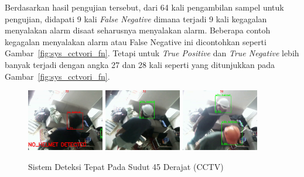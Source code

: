 Berdasarkan hasil pengujian tersebut, dari 64 kali pengambilan sampel untuk pengujian, didapati 9 kali \emph{False Negative} dimana terjadi 9 kali kegagalan menyalakan alarm disaat seharusnya menyalakan alarm. Beberapa contoh kegagalan menyalakan alarm atau False Negative ini dicontohkan seperti Gambar~\ref{fig:sys_cctvori_fn}. Tetapi untuk \emph{True Positive} dan \emph{True Negative} lebih banyak terjadi dengan angka 27 dan 28 kali seperti yang ditunjukkan pada Gambar~\ref{fig:sys_cctvori_fn}.

\begin{figure} [h]
    \centering
    \includegraphics[width=0.3\textwidth]{gambar/sistem_cctvori/betuls/cctv_perspective_pred (7).png}
    \includegraphics[width=0.3\textwidth]{gambar/sistem_cctvori/betuls/cctv_perspective_pred (11).png}
    \includegraphics[width=0.3\textwidth]{gambar/sistem_cctvori/betuls/cctv_perspective_pred (53).png}
    \caption{Sistem Deteksi Tepat Pada Sudut 45 Derajat (CCTV)}
    \label{fig:sys_cctvori_true}  
\end{figure}

